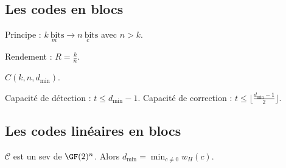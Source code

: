 \subsection{Les codes en blocs}

	Principe : $\underset{m}{k\ \text{bits}} \longrightarrow \underset{c}{n\ \text{bits}}$ avec $n > k$.
	
	\begin{defn}
		Rendement : $R = \frac{k}{n}$.
	\end{defn}
	
	\begin{note}
		$C(k,n,d_\min)$.
	\end{note}
	
	\begin{defn}
		Capacité de détection : $t \leq d_\min - 1$. Capacité de correction : $t \leq \lfloor \frac{d_\min - 1}{2} \rfloor$.
	\end{defn}
	
\subsection{Les codes linéaires en blocs}

	$\mathcal{C}$ est un sev de $\GF(2)^n$.
	Alors $d_\min = \min_{c \neq 0} w_H(c)$.
